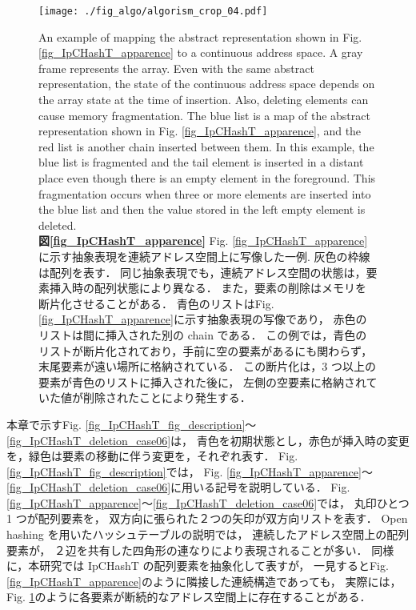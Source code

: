 \begin{figure}
  \texttt{[image: ./fig\_algo/algorism\_crop\_04.pdf]}
  \caption{
    An example of mapping the abstract representation shown in Fig. \ref{fig_IpCHashT_apparence} to a continuous address space.
    A gray frame represents the array.
    Even with the same abstract representation,
    the state of the continuous address space depends on the array state at the time of insertion.
    Also, deleting elements can cause memory fragmentation.
    The blue list is a map of the abstract representation shown in Fig. \ref{fig_IpCHashT_apparence},
    and the red list is another chain inserted between them.
    In this example,
    the blue list is fragmented and the tail element is inserted in a distant place
    even though there is an empty element in the foreground.
    This fragmentation occurs when three or more elements are inserted into the blue list
    and then the value stored in the left empty element is deleted.
    \\
    {\bf 図\ref{fig_IpCHashT_apparence}}
    Fig. \ref{fig_IpCHashT_apparence}に示す抽象表現を連続アドレス空間上に写像した一例.
    灰色の枠線は配列を表す．
    同じ抽象表現でも，連続アドレス空間の状態は，要素挿入時の配列状態により異なる．
    また，要素の削除はメモリを断片化させることがある．
    青色のリストはFig. \ref{fig_IpCHashT_apparence}に示す抽象表現の写像であり，
    赤色のリストは間に挿入された別の chain である．
    この例では，青色のリストが断片化されており，手前に空の要素があるにも関わらず，末尾要素が遠い場所に格納されている．
    この断片化は，3 つ以上の要素が青色のリストに挿入された後に，
    左側の空要素に格納されていた値が削除されたことにより発生する．
  }
  \label{fig_IpCHashT_insert_introspection}
\end{figure}

本章で示すFig. \ref{fig_IpCHashT_fig_description}〜\ref{fig_IpCHashT_deletion_case06}は，
青色を初期状態とし，赤色が挿入時の変更を，緑色は要素の移動に伴う変更を，それぞれ表す．
Fig. \ref{fig_IpCHashT_fig_description}では，
Fig. \ref{fig_IpCHashT_apparence}〜\ref{fig_IpCHashT_deletion_case06}に用いる記号を説明している．
Fig. \ref{fig_IpCHashT_apparence}〜\ref{fig_IpCHashT_deletion_case06}では，
丸印ひとつ 1 つが配列要素を，
双方向に張られた２つの矢印が双方向リストを表す．
Open hashing を用いたハッシュテーブルの説明では，
連続したアドレス空間上の配列要素が，
２辺を共有した四角形の連なりにより表現されることが多い．
同様に，本研究では IpCHashT の配列要素を抽象化して表すが，
一見するとFig. \ref{fig_IpCHashT_apparence}のように隣接した連続構造であっても，
実際には，Fig. \ref{fig_IpCHashT_insert_introspection}のように各要素が断続的なアドレス空間上に存在することがある．

